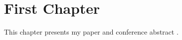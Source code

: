 \documentclass{report}
\begin{document}
    \chapter{First Chapter}
    This chapter presents my paper \cite{whitaker:20:mwf}
    and conference abstract \cite{whitaker:20:mwi}.


    
    
\end{document}
